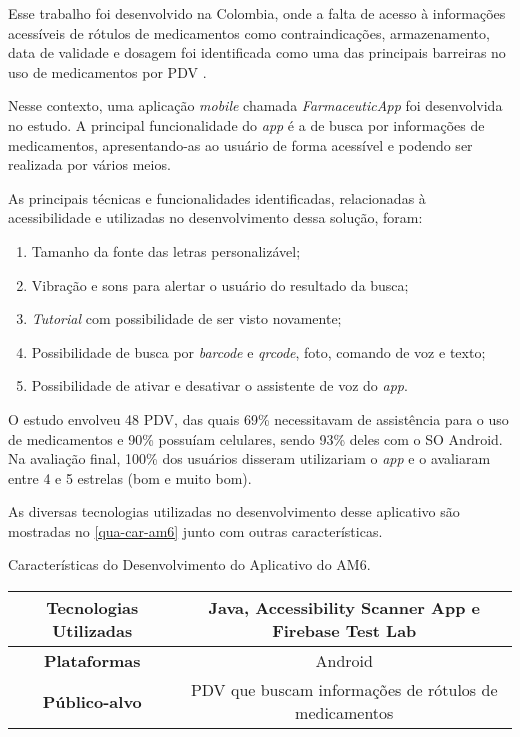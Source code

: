 Esse trabalho foi desenvolvido na Colombia, onde a falta de acesso à informações acessíveis
de rótulos de medicamentos como contraindicações, armazenamento, data de validade e dosagem foi identificada como uma
das principais barreiras no uso de medicamentos por PDV \cite{Amariles2020}.

Nesse contexto, uma aplicação \emph{mobile} chamada \emph{FarmaceuticApp} foi desenvolvida no estudo.
A principal funcionalidade do \emph{app} é a de busca por informações de medicamentos, apresentando-as
ao usuário de forma acessível e podendo ser realizada por vários meios.

As principais técnicas e funcionalidades identificadas, relacionadas à acessibilidade e utilizadas no desenvolvimento dessa solução, foram:

\begin{enumerate}
  \item Tamanho da fonte das letras personalizável;
  \item Vibração e sons para alertar o usuário do resultado da busca;
  \item \emph{Tutorial} com possibilidade de ser visto novamente;
  \item Possibilidade de busca por \emph{barcode} e \emph{qrcode}, foto, comando de voz e texto;
  \item Possibilidade de ativar e desativar o assistente de voz do \emph{app}.
\end{enumerate}

O estudo envolveu 48 PDV, das quais 69\% necessitavam de assistência para o uso de medicamentos e 90\% possuíam celulares, sendo 93\%  deles com o SO Android.
Na avaliação final, 100\% dos usuários disseram utilizariam o \emph{app} e o avaliaram entre 4 e 5 estrelas (bom e muito bom).

As diversas tecnologias utilizadas no desenvolvimento desse aplicativo são mostradas no \autoref{qua-car-am6}
junto com outras características.

\begin{quadro}[htb!]
  \caption{\label{qua-car-am6}Características do Desenvolvimento do Aplicativo do AM6.}
  \begin{tabular}{|c|c|}
    \hline
    \textbf{Tecnologias Utilizadas} & Java, Accessibility Scanner App e Firebase Test Lab   \\ \hline
    \textbf{Plataformas}            & Android                                               \\ \hline
    \textbf{Público-alvo}           & PDV que buscam informações de rótulos de medicamentos \\
    \hline
  \end{tabular}
\end{quadro}

